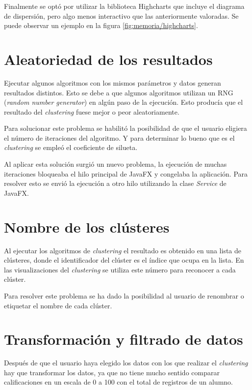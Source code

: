 Finalmente se optó por utilizar la biblioteca Highcharts que incluye el diagrama de dispersión, pero algo menos interactivo que las anteriormente valoradas. Se puede observar un ejemplo en la figura \ref{fig:memoria/highcharts}.



\section{Aleatoriedad de los resultados}
Ejecutar algunos algoritmos con los mismos parámetros y datos generan resultados distintos. Esto se debe a que algunos algoritmos utilizan un RNG (\emph{random number generator}) en algún paso de la ejecución. Esto producía que el resultado del \emph{clustering} fuese mejor o peor aleatoriamente.

Para solucionar este problema se habilitó la posibilidad de que el usuario eligiera el número de iteraciones del algoritmo. Y para determinar lo bueno que es el \emph{clustering} se empleó el coeficiente de silueta.

Al aplicar esta solución surgió un nuevo problema, la ejecución de muchas iteraciones bloqueaba el hilo principal de JavaFX y congelaba la aplicación. Para resolver esto se envió la ejecución a otro hilo utilizando la clase \emph{Service} de JavaFX.

\section{Nombre de los clústeres}
Al ejecutar los algoritmos de \emph{clustering} el resultado es obtenido en una lista de clústeres, donde el identificador del clúster es el índice que ocupa en la lista. En las visualizaciones del \emph{clustering} se utiliza este número para reconocer a cada clúster.

Para resolver este problema se ha dado la posibilidad al usuario de renombrar o etiquetar el nombre de cada clúster.

\section{Transformación y filtrado de datos}
Después de que el usuario haya elegido los datos con los que realizar el \emph{clustering} hay que transformar los datos, ya que no tiene mucho sentido comparar calificaciones en un escala de 0 a 100 con el total de registros de un alumno.

